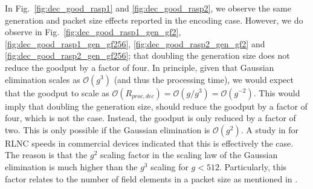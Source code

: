 In Fig.~\ref{fig:dec_good_rasp1} and \ref{fig:dec_good_rasp2}, we
observe the same generation and packet size effects reported in the
encoding case. However, we do observe in
Fig.~\ref{fig:dec_good_rasp1_gen_gf2}, \ref{fig:dec_good_rasp1_gen_gf256},
\ref{fig:dec_good_rasp2_gen_gf2} and \ref{fig:dec_good_rasp2_gen_gf256};
that doubling the generation size does not reduce the goodput by a
factor of four. In principle, given that Gaussian elimination scales as
$\mathcal{O}(g^3)$ (and thus the processing time), we would expect that
the goodput to scale as $\mathcal{O}(R_{proc,dec}) = \mathcal{O}(g/g^{3}) =
\mathcal{O}(g^{-2})$. This would imply that doubling the generation
size, should reduce the goodput by a factor of four, which is not the case. Instead,
the goodput is only reduced by a factor of two. This is only possible if
the Gaussian elimination is $\mathcal{O}(g^2)$. A study in
\cite{paramanathan2013leanandmean} for \ac{RLNC} speeds in commercial
devices indicated that this is effectively the case. The reason is that
the $g^2$ scaling factor in the scaling law of the Gaussian elimination
is much
higher than the $g^3$ scaling for $g < 512$. Particularly, this factor
relates to the number of field elements in a packet size as mentioned
in \cite{paramanathan2013leanandmean}.


